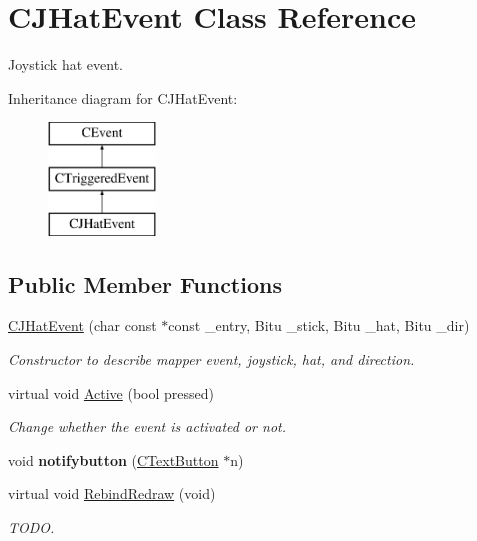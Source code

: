 \hypertarget{classCJHatEvent}{\section{C\-J\-Hat\-Event Class Reference}
\label{classCJHatEvent}
}


Joystick hat event.  


Inheritance diagram for C\-J\-Hat\-Event\-:\begin{figure}[H]
\begin{center}
\leavevmode
\includegraphics[height=3.000000cm]{classCJHatEvent}
\end{center}
\end{figure}
\subsection*{Public Member Functions}
\begin{DoxyCompactItemize}
\item 
\hypertarget{classCJHatEvent_a75c1276a13b233799993bb69bfbffedf}{\hyperlink{classCJHatEvent_a75c1276a13b233799993bb69bfbffedf}{C\-J\-Hat\-Event} (char const $\ast$const \-\_\-entry, Bitu \-\_\-stick, Bitu \-\_\-hat, Bitu \-\_\-dir)}\label{classCJHatEvent_a75c1276a13b233799993bb69bfbffedf}

\begin{DoxyCompactList}\small\item\em Constructor to describe mapper event, joystick, hat, and direction. \end{DoxyCompactList}\item 
\hypertarget{classCJHatEvent_ad4b66a30f706388e5568090963a22dee}{virtual void \hyperlink{classCJHatEvent_ad4b66a30f706388e5568090963a22dee}{Active} (bool pressed)}\label{classCJHatEvent_ad4b66a30f706388e5568090963a22dee}

\begin{DoxyCompactList}\small\item\em Change whether the event is activated or not. \end{DoxyCompactList}\item 
\hypertarget{classCJHatEvent_a45aec7b7ece627bc98e8c0609b4f811e}{void {\bfseries notifybutton} (\hyperlink{classCTextButton}{C\-Text\-Button} $\ast$n)}\label{classCJHatEvent_a45aec7b7ece627bc98e8c0609b4f811e}

\item 
\hypertarget{classCJHatEvent_a5f79e810066c2abad7883b5e311fa573}{virtual void \hyperlink{classCJHatEvent_a5f79e810066c2abad7883b5e311fa573}{Rebind\-Redraw} (void)}\label{classCJHatEvent_a5f79e810066c2abad7883b5e311fa573}

\begin{DoxyCompactList}\small\item\em T\-O\-D\-O. \end{DoxyCompactList}\end{DoxyCompactItemize}
